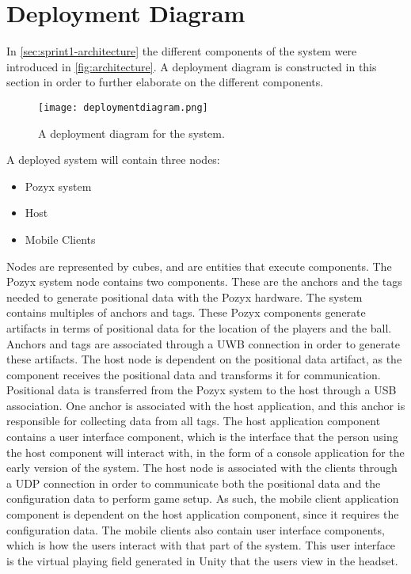 \section{Deployment Diagram}\label{sec:sprint2-deploymentdia}
In \autoref{sec:sprint1-architecture} the different components of the system were introduced in \autoref{fig:architecture}.
A deployment diagram is constructed in this section in order to further elaborate on the different components.
\begin{figure}[H]
    \centering
    \texttt{[image: deploymentdiagram.png]}
    \caption{A deployment diagram for the system.}
    \label{fig:sprint2-deployment}
\end{figure}
\noindent
A deployed system will contain three nodes:
\begin{itemize}
    \item Pozyx system
    \item Host
    \item Mobile Clients
\end{itemize}
Nodes are represented by cubes, and are entities that execute components.
The Pozyx system node contains two components.
These are the anchors and the tags needed to generate positional data with the Pozyx hardware.
The system contains multiples of anchors and tags.
These Pozyx components generate artifacts in terms of positional data for the location of the players and the ball.
Anchors and tags are associated through a UWB connection in order to generate these artifacts.
The host node is dependent on the positional data artifact, as the component receives the positional data and transforms it for communication.
Positional data is transferred from the Pozyx system to the host through a USB association.
One anchor is associated with the host application, and this anchor is responsible for collecting data from all tags.
The host application component contains a user interface component, which is the interface that the person using the host component will interact with, in the form of a console application for the early version of the system.
The host node is associated with the clients through a UDP connection in order to communicate both the positional data and the configuration data to perform game setup.
As such, the mobile client application component is dependent on the host application component, since it requires the configuration data.
The mobile clients also contain user interface components, which is how the users interact with that part of the system.
This user interface is the virtual playing field generated in Unity that the users view in the headset.
